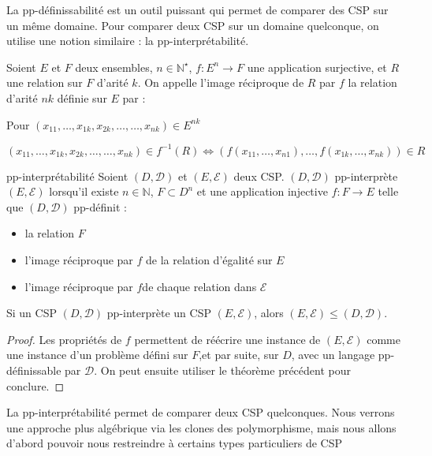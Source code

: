 La pp-définissabilité est un outil puissant qui permet de comparer des CSP sur un même domaine. Pour comparer deux CSP sur un domaine quelconque, on utilise une notion similaire : la pp-interprétabilité.

\begin{defi}{}
Soient $E$ et $F$ deux ensembles, $n \in \mathbb{N}^\star$, $f : E^n \rightarrow F$ une application surjective, et $R$ une relation sur $F$ d'arité $k$. On appelle l'image réciproque de $R$ par $f$ la relation d'arité $nk$ définie sur $E$ par :

Pour $(x_{11},\dots,x_{1k},x_{2k},\dots,\dots,x_{nk}) \in E^{nk}$

$$(x_{11},\dots,x_{1k},x_{2k},\dots,\dots,x_{nk}) \in f^{-1}(R) \iff (f(x_{11},\dots,x_{n1}),\dots,f(x_{1k},\dots,x_{nk})) \in R$$
\end{defi}

\begin{defi}{pp-interprétabilité}
Soient $(D,\mathcal{D})$ et $(E,\mathcal{E})$ deux CSP. $(D,\mathcal{D})$ pp-interprète $(E,\mathcal{E})$ lorsqu'il existe $n \in \mathbb{N}$, $F \subset D^n$ et une application injective $f : F \rightarrow E$ telle que $(D,\mathcal{D})$ pp-définit :
\begin{itemize}
	\item la relation $F$
	\item l'image réciproque par $f$ de la relation d'égalité sur $E$
	\item l'image réciproque par $f$de chaque relation dans $\mathcal{E}$
\end{itemize}
\end{defi}

\begin{theo}
Si un CSP $(D,\mathcal{D})$ pp-interprète un CSP $(E,\mathcal{E})$, alors $(E,\mathcal{E}) \leq (D,\mathcal{D})$.
\end{theo}

\begin{proof}
Les propriétés de $f$ permettent de réécrire une instance de $(E,\mathcal{E})$ comme une instance d'un problème défini sur $F$,et par suite, sur $D$, avec un langage pp-définissable par $\mathcal{D}$. On peut ensuite utiliser le théorème précédent pour conclure.
\end{proof}

La pp-interprétabilité permet de comparer deux CSP quelconques. Nous verrons une approche plus algébrique via les clones des polymorphisme, mais nous allons d'abord pouvoir nous restreindre à certains types particuliers de CSP

